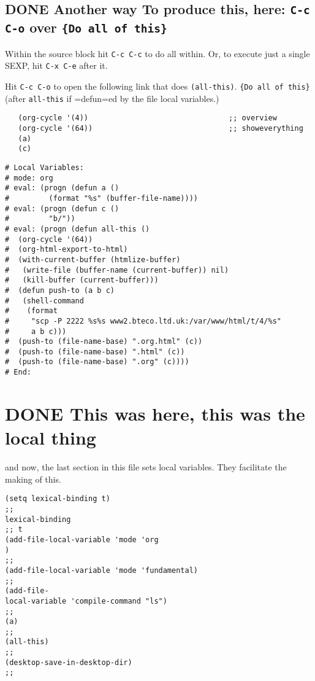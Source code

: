 \documentclass[11pt]{article}
\begin{document}
\subsection*{\textbf{DONE} Another way To produce this, here: \verb~C-c C-o~ over \texttt{\{Do all of this\}}}
\label{sec-5-3}


  Within the source block hit \texttt{C-c C-c} to do all within.
  Or, to execute just a single SEXP, hit \texttt{C-x C-e} after it.

  Hit \texttt{C-c C-o} to open the following link that does \texttt{(all-this)}.
  \texttt{\{Do all of this\}} (after \texttt{all-this} if =defun=ed by the file local variables.)

\begin{verbatim}
   (org-cycle '(4))                                ;; overview
   (org-cycle '(64))                               ;; showeverything
   (a)
   (c)
\end{verbatim}

\begin{verbatim}
# Local Variables:
# mode: org
# eval: (progn (defun a ()
#         (format "%s" (buffer-file-name))))
# eval: (progn (defun c ()
#         "b/"))
# eval: (progn (defun all-this ()
#  (org-cycle '(64))
#  (org-html-export-to-html)
#  (with-current-buffer (htmlize-buffer) 
#   (write-file (buffer-name (current-buffer)) nil)
#   (kill-buffer (current-buffer)))
#  (defun push-to (a b c)
#   (shell-command
#    (format
#     "scp -P 2222 %s%s www2.bteco.ltd.uk:/var/www/html/t/4/%s"
#     a b c)))
#  (push-to (file-name-base) ".org.html" (c))
#  (push-to (file-name-base) ".html" (c))
#  (push-to (file-name-base) ".org" (c))))
# End:
\end{verbatim}
\section*{\textbf{DONE} This was here, this was the local thing}
\label{sec-6}

  and now, the last section in this file sets local variables. They facilitate
  the making of this.

\begin{verbatim}
(setq lexical-binding t)
;; 
lexical-binding
;; t
(add-file-local-variable 'mode 'org
)
;;
(add-file-local-variable 'mode 'fundamental)
;;
(add-file-
local-variable 'compile-command "ls")
;; 
(a)
;;
(all-this)
;;   
(desktop-save-in-desktop-dir)
;;
\end{verbatim}


\end{document}

